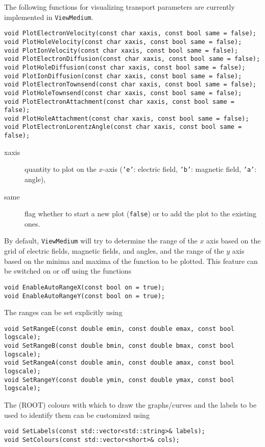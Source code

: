 The following functions for visualizing transport parameters 
are currently implemented in \texttt{ViewMedium}.
\begin{lstlisting}
void PlotElectronVelocity(const char xaxis, const bool same = false);
void PlotHoleVelocity(const char xaxis, const bool same = false);
void PlotIonVelocity(const char xaxis, const bool same = false);
void PlotElectronDiffusion(const char xaxis, const bool same = false);
void PlotHoleDiffusion(const char xaxis, const bool same = false);
void PlotIonDiffusion(const char xaxis, const bool same = false);
void PlotElectronTownsend(const char xaxis, const bool same = false);
void PlotHoleTownsend(const char xaxis, const bool same = false);
void PlotElectronAttachment(const char xaxis, const bool same = false);
void PlotHoleAttachment(const char xaxis, const bool same = false);
void PlotElectronLorentzAngle(const char xaxis, const bool same = false);
\end{lstlisting}
\begin{description}
  \item[xaxis] quantity to plot on the $x$-axis (\texttt{'e'}: electric field, 
  \texttt{'b'}: magnetic field, \texttt{'a'}: angle),
  \item[same] flag whether to start a new plot (\texttt{false}) or to add the 
plot to the existing ones.
\end{description}
By default, \texttt{ViewMedium} will try to determine the range of the 
$x$ axis based on the grid of electric fields, magnetic fields, 
and angles, and the range of the $y$ axis based on the 
minima and maxima of the function to be plotted. This feature can be 
switched on or off using the functions
\begin{lstlisting}
void EnableAutoRangeX(const bool on = true);
void EnableAutoRangeY(const bool on = true);
\end{lstlisting}
The ranges can be set explicitly using
\begin{lstlisting}
void SetRangeE(const double emin, const double emax, const bool logscale);
void SetRangeB(const double bmin, const double bmax, const bool logscale);
void SetRangeA(const double amin, const double amax, const bool logscale);
void SetRangeY(const double ymin, const double ymax, const bool logscale);
\end{lstlisting}
The (ROOT) colours with which to draw the graphs/curves and the labels
to be used to identify them can be customized using
\begin{lstlisting}
void SetLabels(const std::vector<std::string>& labels);
void SetColours(const std::vector<short>& cols);
\end{lstlisting}

